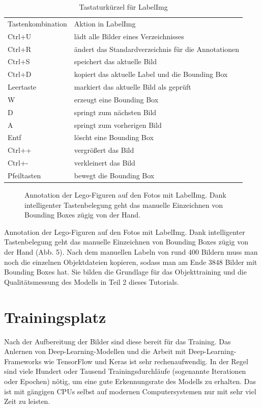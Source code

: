 \begin{table}
\caption{Tastaturkürzel für LabelImg}

\begin{tabular}{ll}
	Tastenkombination & Aktion in LabelImg \\
	Ctrl+U & lädt alle Bilder eines Verzeichnisses \\
	Ctrl+R  &ändert das Standardverzeichnis für die Annotationen \\
	Ctrl+S & speichert das aktuelle Bild \\
	Ctrl+D &kopiert das aktuelle Label und die Bounding Box \\
	Leertaste & markiert das aktuelle Bild als geprüft \\
	W &erzeugt eine Bounding Box  \\
	D & springt zum nächsten Bild \\
	A & springt zum vorherigen Bild \\
	Entf & löscht eine Bounding Box \\
	Ctrl++ & vergrößert das Bild \\
	Ctrl+- & verkleinert das Bild \\
	Pfeiltasten & bewegt die Bounding Box 
\end{tabular}
\end{table}


\begin{figure}


\caption{Annotation der Lego-Figuren auf den Fotos mit LabelImg. Dank intelligenter Tastenbelegung geht das manuelle Einzeichnen von Bounding Boxes zügig von der Hand.}
\end{figure} 



Annotation der Lego-Figuren auf den Fotos mit LabelImg. Dank intelligenter Tastenbelegung geht das manuelle Einzeichnen von Bounding Boxes zügig von der Hand (Abb. 5). 
Nach dem manuellen Labeln von rund 400 Bildern muss man noch die einzelnen Objektdateien kopieren, sodass man am Ende 3848 Bilder mit Bounding Boxes hat. Sie bilden die Grundlage für das Objekttraining und die Qualitätsmessung des Modells in Teil 2 dieses Tutorials. 

\section{Trainingsplatz}

Nach der Aufbereitung der Bilder sind diese bereit für das Training. Das Anlernen von Deep-Learning-Modellen und die Arbeit mit Deep-Learning-Frameworks wie TensorFlow und Keras ist sehr rechenaufwendig. In der Regel sind viele Hundert oder Tausend Trainingsdurchläufe (sogenannte Iterationen oder Epochen) nötig, um eine gute Erkennungsrate des Modells zu erhalten. Das ist mit gängigen CPUs selbst auf modernen Computersystemen nur mit sehr viel Zeit zu leisten. 

